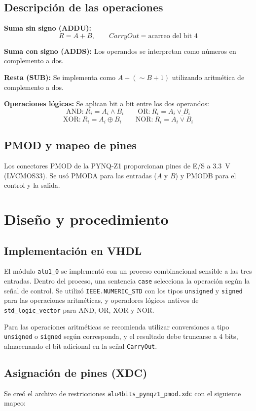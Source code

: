 \documentclass[12pt,letterpaper]{article}
\begin{document}
\subsection{Descripción de las operaciones}
\textbf{Suma sin signo (ADDU):}
\[
R = A + B, \qquad CarryOut = \text{acarreo del bit 4}
\]

\textbf{Suma con signo (ADDS):} Los operandos se interpretan como números en complemento a dos.

\textbf{Resta (SUB):} Se implementa como $A + (\sim B + 1)$ utilizando aritmética de complemento a dos.

\textbf{Operaciones lógicas:} Se aplican bit a bit entre los dos operandos:
\[
\text{AND:}\ R_i = A_i \land B_i \qquad
\text{OR:}\ R_i = A_i \lor B_i
\]
\[
\text{XOR:}\ R_i = A_i \oplus B_i \qquad
\text{NOR:}\ R_i = \overline{A_i \lor B_i}
\]

\subsection{PMOD y mapeo de pines}
Los conectores PMOD de la PYNQ-Z1 proporcionan pines de E/S a \SI{3.3}{\volt} (LVCMOS33).
Se usó PMODA para las entradas ($A$ y $B$) y PMODB para el control y la salida.

\section{Diseño y procedimiento}

\subsection{Implementación en VHDL}
El módulo \texttt{alu1\_0} se implementó con un proceso combinacional sensible a las tres entradas.
Dentro del proceso, una sentencia \texttt{case} selecciona la operación según la señal de control.
Se utilizó \texttt{IEEE.NUMERIC\_STD} con los tipos \texttt{unsigned} y \texttt{signed} para las operaciones aritméticas, y operadores lógicos nativos de \texttt{std\_logic\_vector} para AND, OR, XOR y NOR.

Para las operaciones aritméticas se recomienda utilizar conversiones a tipo \texttt{unsigned} o \texttt{signed} según corresponda, y el resultado debe truncarse a 4 bits, almacenando el bit adicional en la señal \texttt{CarryOut}.

\subsection{Asignación de pines (XDC)}
Se creó el archivo de restricciones \texttt{alu4bits\_pynqz1\_pmod.xdc} con el siguiente mapeo:
\end{document}
